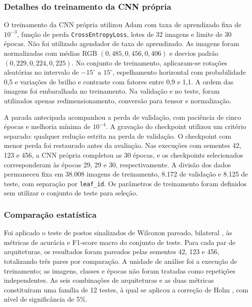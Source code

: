 \subsubsection{Detalhes do treinamento da CNN própria}
O treinamento da CNN própria utilizou Adam com taxa de aprendizado fixa
de $10^{-3}$, função de perda \texttt{CrossEntropyLoss}, lotes de 32
imagens e limite de 30 épocas. Não foi utilizado agendador de taxa de
aprendizado. As imagens foram normalizadas com médias RGB
$(0{,}485,0{,}456,0{,}406)$ e desvios padrão
$(0{,}229,0{,}224,0{,}225)$. No conjunto de treinamento, aplicaram-se
rotações aleatórias no intervalo de $-15^\circ$ a $15^\circ$, espelhamento
horizontal com probabilidade 0,5 e variações de brilho e contraste com
fatores entre 0,9 e 1,1. A ordem das imagens foi embaralhada no treinamento.
Na validação e no teste, foram utilizados apenas redimensionamento,
conversão para tensor e normalização.

A parada antecipada acompanhou a perda de validação, com paciência de
cinco épocas e melhoria mínima de $10^{-4}$. A gravação do checkpoint
utilizou um critério separado: qualquer redução estrita na perda de
validação. O checkpoint com menor perda foi restaurado antes da avaliação.
Nas execuções com sementes 42, 123 e 456, a CNN própria completou as 30
épocas, e os checkpoints selecionados corresponderam às épocas 29, 29 e
30, respectivamente. A divisão dos dados permaneceu fixa em 38.008 imagens
de treinamento, 8.172 de validação e 8.125 de teste, com separação por
\texttt{leaf\_id}. Os parâmetros de treinamento foram definidos sem utilizar
o conjunto de teste para seleção.

\subsubsection{Comparação estatística}
Foi aplicado o teste de postos sinalizados de Wilcoxon pareado, bilateral
\cite{wilcoxon1945},
às métricas de acurácia e F1-score macro do conjunto de teste. Para cada
par de arquiteturas, os resultados foram pareados pelas sementes 42, 123
e 456, totalizando três pares por comparação. A unidade de análise foi a
execução de treinamento; as imagens, classes e épocas não foram tratadas
como repetições independentes. As seis combinações de arquiteturas e as
duas métricas constituíram uma família de 12 testes, à qual se aplicou a
correção de Holm \cite{holm1979}, com nível de significância de 5\%.

